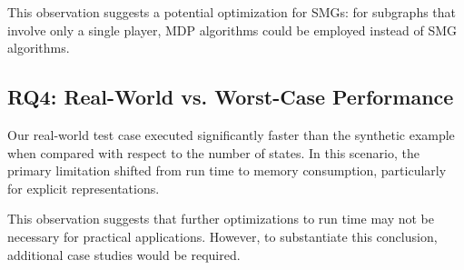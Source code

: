 This observation suggests a potential optimization for SMGs: for subgraphs that involve only a single player, MDP algorithms could be employed instead of SMG algorithms.

\subsection{\textbf{RQ4}: Real-World vs. Worst-Case Performance}
Our real-world test case executed significantly faster than the synthetic example when compared with respect to the number of states. In this scenario, the primary limitation shifted from run time to memory consumption, particularly for explicit representations.

This observation suggests that further optimizations to run time may not be necessary for practical applications. However, to substantiate this conclusion, additional case studies would be required.